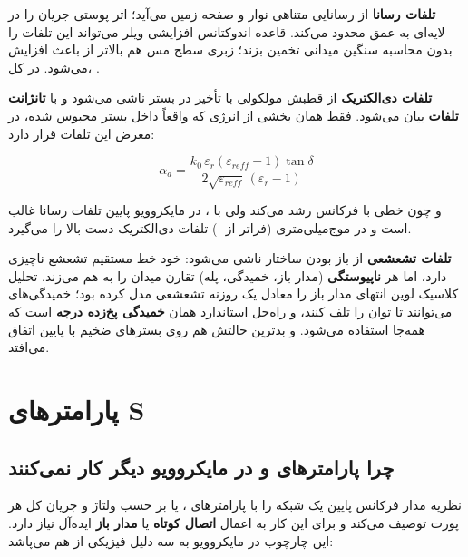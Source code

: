 \documentclass[12pt]{article}
\begin{document}
	\textbf{تلفات رسانا } از رسانایی متناهی نوار و صفحه زمین می‌آید؛ اثر پوستی جریان را در لایه‌ای به عمق  محدود می‌کند. قاعده اندوکتانس افزایشی ویلر  می‌تواند این تلفات را بدون محاسبه سنگین میدانی تخمین بزند؛ زبری سطح مس هم بالاتر از  باعث افزایش  می‌شود. در کل، .
	
	\textbf{تلفات دی‌الکتریک } از قطبش مولکولی با تأخیر در بستر ناشی می‌شود و با \textbf{تانژانت تلفات} \lr{$\tan\delta$} بیان می‌شود. فقط همان بخشی از انرژی که واقعاً داخل بستر محبوس شده، در معرض این تلفات قرار دارد:
	
	\begin{equation}
		\alpha_d = \frac{k_0\,\varepsilon_r(\varepsilon_{reff}-1)\tan\delta}{2\sqrt{\varepsilon_{reff}}\,(\varepsilon_r-1)}
	\end{equation}
	
	و چون  خطی با فرکانس رشد می‌کند ولی  با ، در مایکروویو پایین تلفات رسانا غالب است و در موج‌میلی‌متری (فراتر از -) تلفات دی‌الکتریک دست بالا را می‌گیرد.
	
	\textbf{تلفات تشعشعی } از باز بودن ساختار ناشی می‌شود: خود خط مستقیم تشعشع ناچیزی دارد، اما هر \textbf{ناپیوستگی} (مدار باز، خمیدگی، پله) تقارن میدان را به هم می‌زند. تحلیل کلاسیک لوین  انتهای مدار باز را معادل یک روزنه تشعشعی مدل کرده بود؛ خمیدگی‌های  می‌توانند تا  توان را تلف کنند، و راه‌حل استاندارد همان \textbf{خمیدگی پخ‌زده درجه} است که همه‌جا استفاده می‌شود.  و بدترین حالتش هم روی بسترهای ضخیم با  پایین اتفاق می‌افتد.
	

	\section{پارامترهای S }

	
	\subsection{چرا پارامترهای  و  در مایکروویو دیگر کار نمی‌کنند}
	
	نظریه مدار فرکانس پایین یک شبکه را با پارامترهای ،  یا  بر حسب ولتاژ و جریان کل هر پورت توصیف می‌کند و برای این کار به اعمال \textbf{اتصال کوتاه} یا \textbf{مدار باز} ایده‌آل نیاز دارد. این چارچوب در مایکروویو به سه دلیل فیزیکی از هم می‌پاشد:
	
\end{document}

